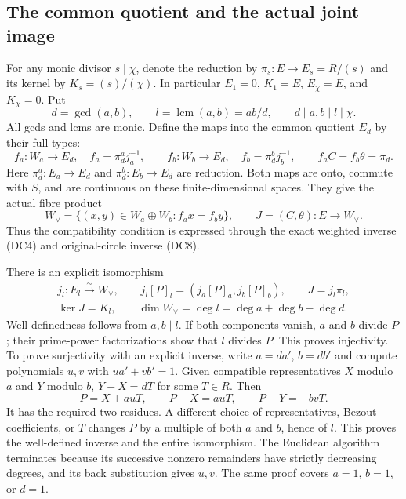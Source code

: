 \subsection{The common quotient and the actual joint image}

For any monic divisor $s\mid\chi$, denote the reduction by
$\pi_s:E\to E_s=R/(s)$ and its kernel by $K_s=(s)/(\chi)$.
In particular $E_1=0$, $K_1=E$, $E_\chi=E$, and $K_\chi=0$.
Put
\[
 d=\gcd(a,b),\qquad l=\operatorname{lcm}(a,b)=ab/d,\qquad
 d\mid a,b\mid l\mid\chi .
 \tag{DC9}
\]
All gcds and lcms are monic.  Define the maps into the common quotient
$E_d$ by their full types:
\[
 f_a:W_a\to E_d,\quad f_a=\pi_d^a j_a^{-1},\qquad
 f_b:W_b\to E_d,\quad f_b=\pi_d^b j_b^{-1},
 \qquad f_a C=f_b\theta=\pi_d .
 \tag{DC10}
\]
Here $\pi_d^a:E_a\to E_d$ and $\pi_d^b:E_b\to E_d$ are reduction.
Both maps are onto, commute with $S$, and are continuous on these
finite-dimensional spaces.  They give the actual fibre product
\[
 W_\vee=
 \{(x,y)\in W_a\oplus W_b:f_a x=f_b y\},\qquad
 J=(C,\theta):E\to W_\vee .
 \tag{DC11}
\]
Thus the compatibility condition is expressed through the exact
weighted inverse (DC4) and original-circle inverse (DC8).

There is an explicit isomorphism
\[
 \begin{gathered}
 j_l:E_l\xrightarrow{\sim}W_\vee,\qquad
 j_l[P]_l=(j_a[P]_a,j_b[P]_b),\qquad J=j_l\pi_l,\\
 \ker J=K_l,\qquad
 \dim W_\vee=\deg l=\deg a+\deg b-\deg d .
 \end{gathered}
 \tag{DC12}
\]
Well-definedness follows from $a,b\mid l$.  If both components vanish,
$a$ and $b$ divide $P$; their prime-power factorizations show that $l$
divides $P$.  This proves injectivity.  To prove surjectivity with an
explicit inverse, write $a=da'$, $b=db'$ and compute polynomials
$u,v$ with $ua'+vb'=1$.  Given compatible representatives
$X$ modulo $a$ and $Y$ modulo $b$, $Y-X=dT$ for some $T\in R$.
Then
\[
 P=X+auT,\qquad
 P-X=auT,\qquad P-Y=-bvT.
 \tag{DC13}
\]
It has the required two residues.  A different choice of
representatives, Bezout coefficients, or $T$ changes $P$ by a
multiple of both $a$ and $b$, hence of $l$.  This proves the
well-defined inverse and the entire isomorphism.  The Euclidean
algorithm terminates because its successive nonzero remainders have
strictly decreasing degrees, and its back substitution gives $u,v$.
The same proof covers $a=1$, $b=1$, or $d=1$.

